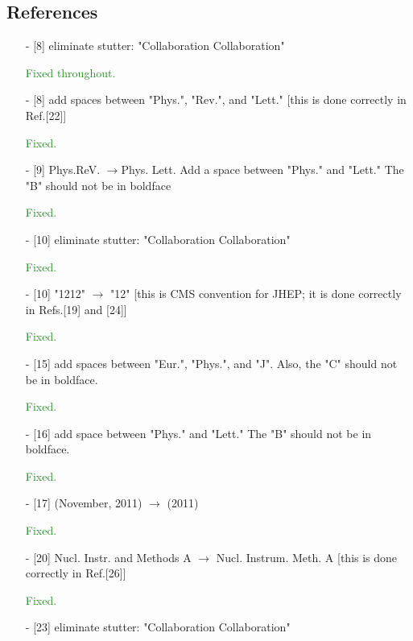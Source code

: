 \documentclass[paper=a4, fontsize=11pt]{scrartcl}
\begin{document}
\subsection{References}
\begin{itemize}
\item [-] [8] eliminate stutter: "Collaboration Collaboration"

\textcolor{ForestGreen}{Fixed throughout.}

\item  [-] [8] add spaces between "Phys.", "Rev.", and "Lett."
 [this is done correctly in Ref.[22]]
 
\textcolor{ForestGreen}{Fixed.}

\item [-]  [9] Phys.ReV.  $\rightarrow$Phys. Lett.
 Add a space between "Phys." and "Lett."
 The "B" should not be in boldface
 
\textcolor{ForestGreen}{Fixed.}

\item [-]  [10] eliminate stutter: "Collaboration Collaboration"

\textcolor{ForestGreen}{Fixed.}

\item [-]  [10] "1212"  $\rightarrow$  "12" [this is CMS convention for JHEP;
 it is done correctly in Refs.[19] and [24]]
 
\textcolor{ForestGreen}{Fixed.}

\item [-]  [15] add spaces between "Eur.", "Phys.", and "J".
 Also, the "C" should not be in boldface.
 
\textcolor{ForestGreen}{Fixed.}

\item [-]  [16] add space between "Phys." and "Lett."
 The "B" should not be in boldface.

\textcolor{ForestGreen}{Fixed.}

\item  [-] [17] (November, 2011)  $\rightarrow$ (2011)

\textcolor{ForestGreen}{Fixed.}

\item [-]  [20] Nucl. Instr. and Methods A  $\rightarrow$ Nucl. Instrum. Meth. A
 [this is done correctly in Ref.[26]]
 
\textcolor{ForestGreen}{Fixed.}

\item  [-] [23] eliminate stutter: "Collaboration Collaboration"


\end{itemize}
\end{document}
